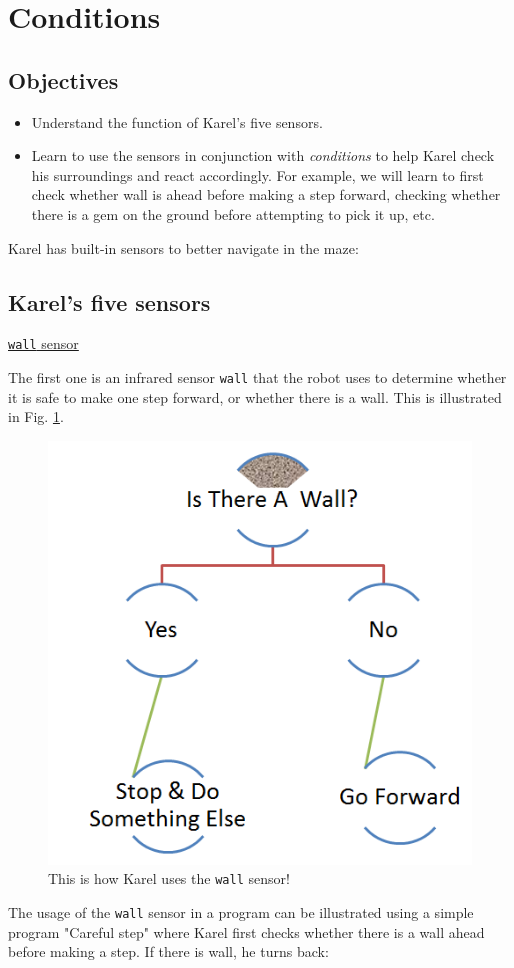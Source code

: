 \documentclass[article,A4,12pt]{llncs}
\begin{document}

\section{Conditions} \label{sec:cond}

\subsection{Objectives} 

\begin{itemize}
\item Understand the function of Karel's five sensors.
\item Learn to use the sensors in conjunction with {\em conditions} to help Karel 
      check his surroundings and react accordingly. For example, we will learn to first 
      check whether wall is ahead before making a step forward, checking whether there
      is a gem on the ground before attempting to pick it up, etc.
\end{itemize}

\noindent
Karel has built-in sensors to better navigate in the maze:

\subsection{Karel's five sensors}

\noindent
\underline{{\tt wall} sensor}

The first one is an infrared sensor {\tt wall} that the robot uses to determine 
whether it is safe to make one step forward, or whether there is a wall. This is 
illustrated in Fig. \ref{fig:dede-ifelse}.
\newpage
\begin{figure}[!ht]
\begin{center}
\includegraphics[height=0.4\textwidth]{img/salih-ifelse.png}
\end{center}
\vspace{-4mm}
\caption{This is how Karel uses the {\tt wall} sensor!}
\label{fig:dede-ifelse}
\end{figure}
\noindent
The usage of the {\tt wall} sensor in a program can be illustrated using a simple program "Careful step" 
where Karel first checks whether there is a wall ahead before
making a step. If there is wall, he turns back: 
\end{document}
